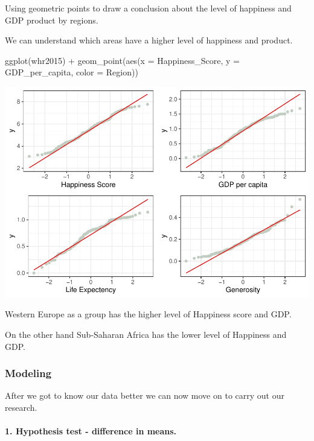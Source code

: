 \documentclass[
]{article}
\newenvironment{Shaded}{\begin{snugshade}}{\end{snugshade}}
\newcommand{\AttributeTok}[1]{\textcolor[rgb]{0.77,0.63,0.00}{#1}}
\newcommand{\FunctionTok}[1]{\textcolor[rgb]{0.00,0.00,0.00}{#1}}
\newcommand{\NormalTok}[1]{#1}
\newcommand{\SpecialCharTok}[1]{\textcolor[rgb]{0.00,0.00,0.00}{#1}}
\begin{document}
Using geometric points to draw a conclusion about the level of happiness
and GDP product by regions.

We can understand which areas have a higher level of happiness and
product.

\begin{Shaded}
\begin{Highlighting}[]
\FunctionTok{ggplot}\NormalTok{(whr2015) }\SpecialCharTok{+} \FunctionTok{geom\_point}\NormalTok{(}\FunctionTok{aes}\NormalTok{(}\AttributeTok{x =}\NormalTok{ Happiness\_Score, }\AttributeTok{y =}\NormalTok{ GDP\_per\_capita, }\AttributeTok{color =}\NormalTok{ Region))}
\end{Highlighting}
\end{Shaded}

\includegraphics{World-Happiness_files/figure-latex/unnamed-chunk-7-1.pdf}

Western Europe as a group has the higher level of Happiness score and
GDP.

On the other hand Sub-Saharan Africa has the lower level of Happiness
and GDP.

\hfill\break

\hypertarget{modeling}{%
\subsubsection{Modeling}\label{modeling}}

After we got to know our data better we can now move on to carry out our
research.

\hypertarget{hypothesis-test---difference-in-means.}{%
\paragraph{1. Hypothesis test - difference in
means.}\label{hypothesis-test---difference-in-means.}}
\end{document}
